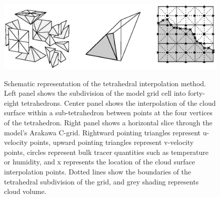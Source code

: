 \documentclass[12pt]{article}
\begin{document}





{}
{\clearpage}




\begin{figure}[t]
  \noindent
  \includegraphics[width=40pc,angle=0]{./figures/tetrahedral_scheme}\\
  \caption{Schematic representation of the tetrahedral interpolation 
  method.  Left panel shows the subdivision of the model grid cell into 
  forty-eight tetrahedrons.  Center panel shows the interpolation of the cloud 
  surface within a sub-tetrahedron between points at the four vertices of the 
  tetrahedron.  Right panel shows a horizontal slice through the model's 
  Arakawa C-grid.  Rightward pointing triangles represent u-velocity points, 
  upward pointing triangles represent v-velocity points, circles represent 
  bulk tracer quantities such as temperature or humidity, and x represents 
  the location of the cloud surface interpolation points.  Dotted lines show 
  the boundaries of the tetrahedral subdivision of the grid, and grey shading 
  represents cloud volume.}
  \label{fig:tetrahedral_scheme}
\end{figure}
\end{document}
